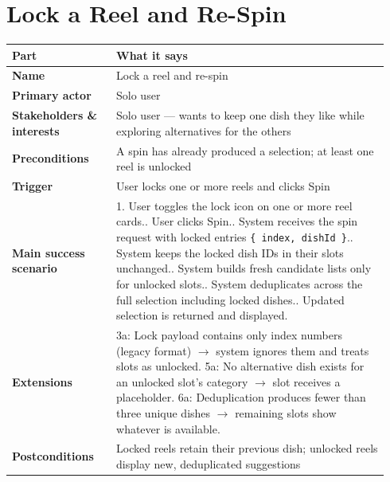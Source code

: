 \documentclass[11pt,twocolumn]{article}
\newcommand{\ucheader}{%
\textbf{Part} & \textbf{What it says} \\
\hline
\endhead
\hline
\endfoot
}
\begin{document}
\section{Lock a Reel and Re-Spin}
{\footnotesize
\begin{longtable}{@{}p{0.26\linewidth}p{0.68\linewidth}@{}}
\hline
\ucheader
\textbf{Name} & Lock a reel and re-spin \\
\hline
\textbf{Primary actor} & Solo user \\
\hline
\textbf{Stakeholders \& interests} & Solo user --- wants to keep one dish they like while exploring alternatives for the others \\
\hline
\textbf{Preconditions} & A spin has already produced a selection; at least one reel is unlocked \\
\hline
\textbf{Trigger} & User locks one or more reels and clicks Spin \\
\hline
\textbf{Main success scenario} & 1. User toggles the lock icon on one or more reel cards.\newline
2. User clicks Spin.\newline
3. System receives the spin request with locked entries \texttt{\{ index, dishId \}}.\newline
4. System keeps the locked dish IDs in their slots unchanged.\newline
5. System builds fresh candidate lists only for unlocked slots.\newline
6. System deduplicates across the full selection including locked dishes.\newline
7. Updated selection is returned and displayed. \\
\hline
\textbf{Extensions} & 3a: Lock payload contains only index numbers (legacy format) $\rightarrow$ system ignores them and treats slots as unlocked.\newline
5a: No alternative dish exists for an unlocked slot's category $\rightarrow$ slot receives a placeholder.\newline
6a: Deduplication produces fewer than three unique dishes $\rightarrow$ remaining slots show whatever is available. \\
\hline
\textbf{Postconditions} & Locked reels retain their previous dish; unlocked reels display new, deduplicated suggestions \\
\hline
\end{longtable}
}
\end{document}
